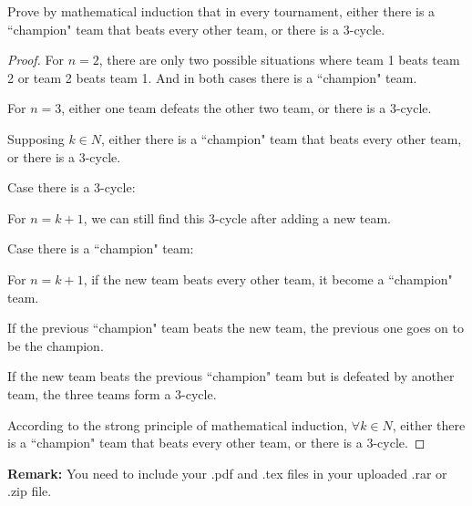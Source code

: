 \documentclass[12pt,a4paper]{article}
\theoremstyle{definition}
\begin{document}
\begin{enumerate}
Prove by mathematical induction that in every tournament, either there is a ``champion" team that beats every other team, or there is a 3-cycle. 
    \begin{proof}
        For $n=2$, there are only two possible situations where team 1 beats team 2 or team 2 beats team 1. And in both cases there is a ``champion" team.

        For $n=3$, either one team defeats the other two team, or there is a 3-cycle.

        Supposing  $k\in N$,  either there is a ``champion" team that beats every other team, or there is a 3-cycle. 

        Case there is a 3-cycle:
         
        \qquad For $n=k+1$, we can still find this 3-cycle after adding a new team.

        Case there is a ``champion" team:

        \qquad For $n=k+1$, if the new team beats every other team, it become a ``champion" team.

        \qquad If the previous ``champion" team beats the new team, the previous one goes on to be the champion.

        \qquad If the new team beats the previous ``champion" team but is defeated by another team, the three teams form a 3-cycle. 

        According to the strong principle of mathematical induction, $\forall k\in N$,  either there is a ``champion" team that beats every other team, or there is a 3-cycle.

    \end{proof}

\end{enumerate}

\vspace{20pt}

\textbf{Remark:} You need to include your .pdf and .tex files in your uploaded .rar or .zip file.

\end{document}
